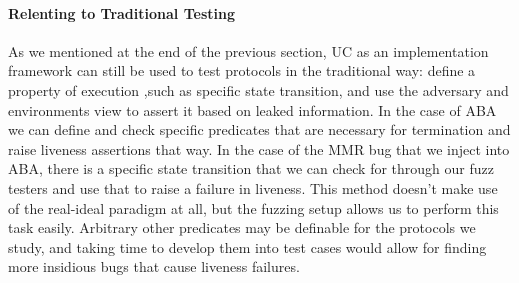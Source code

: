 \paragraph{Relenting to Traditional Testing}
As we mentioned at the end of the previous section, UC as an implementation
framework can still be used to test protocols in the traditional way: define a
property of execution ,such as specific state transition, and use the adversary
and environments view to assert it based on leaked information.  In the case of
ABA we can define and check specific predicates that are necessary for
termination and raise liveness assertions that way.  In the case of the MMR bug
that we inject into ABA, there is a specific state transition that we can check
for through our fuzz testers and use that to raise a failure in liveness.  This
method doesn't make use of the real-ideal paradigm at all, but the fuzzing
setup allows us to perform this task easily.  Arbitrary other predicates may be
definable for the protocols we study, and taking time to develop them into test
cases would allow for finding more insidious bugs that cause liveness failures.


%

